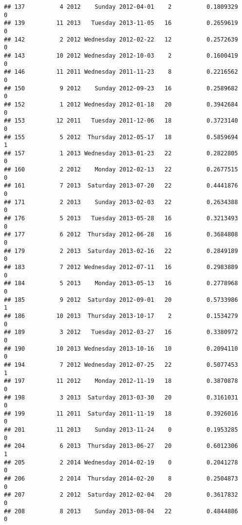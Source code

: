 \documentclass[
]{article}
\begin{document}
\begin{verbatim}
## 137          4 2012    Sunday 2012-04-01    2          0.1809329             0
## 139         11 2013   Tuesday 2013-11-05   16          0.2659619             0
## 142          2 2012 Wednesday 2012-02-22   12          0.2572639             0
## 143         10 2012 Wednesday 2012-10-03    2          0.1600419             0
## 146         11 2011 Wednesday 2011-11-23    8          0.2216562             0
## 150          9 2012    Sunday 2012-09-23   16          0.2589682             0
## 152          1 2012 Wednesday 2012-01-18   20          0.3942684             0
## 153         12 2011   Tuesday 2011-12-06   18          0.3723140             0
## 155          5 2012  Thursday 2012-05-17   18          0.5859694             1
## 157          1 2013 Wednesday 2013-01-23   22          0.2822805             0
## 160          2 2012    Monday 2012-02-13   22          0.2677515             0
## 161          7 2013  Saturday 2013-07-20   22          0.4441876             0
## 171          2 2013    Sunday 2013-02-03   22          0.2634388             0
## 176          5 2013   Tuesday 2013-05-28   16          0.3213493             0
## 177          6 2012  Thursday 2012-06-28   16          0.3684808             0
## 179          2 2013  Saturday 2013-02-16   22          0.2849189             0
## 183          7 2012 Wednesday 2012-07-11   16          0.2983889             0
## 184          5 2013    Monday 2013-05-13   16          0.2778968             0
## 185          9 2012  Saturday 2012-09-01   20          0.5733986             1
## 186         10 2013  Thursday 2013-10-17    2          0.1534279             0
## 189          3 2012   Tuesday 2012-03-27   16          0.3380972             0
## 190         10 2013 Wednesday 2013-10-16   10          0.2094110             0
## 194          7 2012 Wednesday 2012-07-25   22          0.5077453             1
## 197         11 2012    Monday 2012-11-19   18          0.3870878             0
## 198          3 2013  Saturday 2013-03-30   20          0.3161031             0
## 199         11 2011  Saturday 2011-11-19   18          0.3926016             0
## 201         11 2013    Sunday 2013-11-24    0          0.1953285             0
## 204          6 2013  Thursday 2013-06-27   20          0.6012306             1
## 205          2 2014 Wednesday 2014-02-19    0          0.2041278             0
## 206          2 2014  Thursday 2014-02-20    8          0.2504873             0
## 207          2 2012  Saturday 2012-02-04   20          0.3617832             0
## 208          8 2013    Sunday 2013-08-04   22          0.4844886             0

\end{verbatim}
\end{document}
